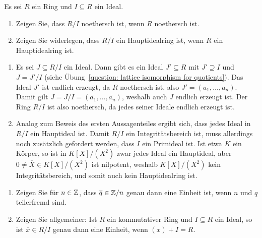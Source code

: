 \begin{question}[subtitle = Noethersch und Hauptidealring für Quotienten]
  Es sei $R$ ein Ring und $I \subseteq R$ ein Ideal.
  \begin{enumerate}
    \item
      Zeigen Sie, dass $R/I$ noethersch ist, wenn $R$ noethersch ist.
    \item
      Zeigen Sie widerlegen, dass $R/I$ ein Hauptidealring ist, wenn $R$ ein Hauptidealring ist.
  \end{enumerate}
\end{question}


\begin{solution}
  \begin{enumerate}
    \item
      Es sei $J \subseteq R/I$ ein Ideal.
      Dann gibt es ein Ideal $J' \subseteq R$ mit $J' \supseteq I$ und $J = J'/I$ (siehe Übung~\ref{question: lattice isomorphism for quotients}).
      Das Ideal $J'$ ist endlich erzeugt, da $R$ noethersch ist, also $J' = (a_1, \dotsc, a_n)$.
      Damit gilt $J = J/I = (\overline{a_1}, \dotsc, \overline{a_n})$, weshalb auch $J$ endlich erzeugt ist.
      Der Ring $R/I$ ist also noethersch, da jedes seiner Ideale endlich erzeugt ist.
    \item
      Analog zum Beweis des ersten Aussagenteiles ergibt sich, dass jedes Ideal in $R/I$ ein Hauptideal ist.
      Damit $R/I$ ein Integritätsbereich ist, muss allerdings noch zusätzlich gefordert werden, dass $I$ ein Primideal ist.
      Ist etwa $K$ ein Körper, so ist in $K[X]/(X^2)$ zwar jedes Ideal ein Hauptideal, aber $0 \neq \overline{X} \in K[X]/(X^2)$ ist nilpotent, weshalb $K[X]/(X^2)$ kein Integritätsbereich, und somit auch kein Hauptidealring ist.
  \end{enumerate}
\end{solution}


\begin{question}[subtitle = Einheiten in Quotienten]
  \label{question: unit group of quotients}
  \begin{enumerate}
    \item
      Zeigen Sie für $n \in \mathbb{Z}$, dass $\overline{q} \in \mathbb{Z}/n$ genau dann eine Einheit ist, wenn $n$ und $q$ teilerfremd sind.
    \item
      Zeigen Sie allgemeiner:
      Ist $R$ ein kommutativer Ring und $I \subseteq R$ ein Ideal, so ist $\overline{x} \in R/I$ genau dann eine Einheit, wenn $(x) + I = R$.
  \end{enumerate}
\end{question}


